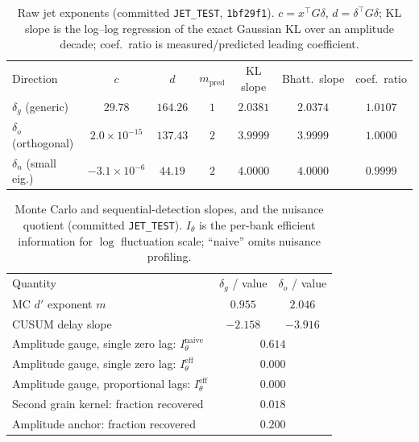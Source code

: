 \documentclass[aps,prl,onecolumn,notitlepage,nofootinbib,superscriptaddress]{revtex4-2}
\begin{document}
\begin{table}[h]
\centering
\caption{Raw jet exponents (committed \texttt{JET\_TEST}, \texttt{1bf29f1}).
$c=x^{\!\top}G\delta$, $d=\delta^{\!\top}G\delta$; KL slope is the log--log
regression of the exact Gaussian KL over an amplitude decade; coef.\ ratio is
measured/predicted leading coefficient.}
\label{tab:jet_exp}
\begin{ruledtabular}
\begin{tabular}{lcccccc}
Direction & $c$ & $d$ & $m_{\mathrm{pred}}$ & KL slope & Bhatt.\ slope & coef.\ ratio\\
\colrule
$\delta_g$ (generic)     & $29.78$              & $164.26$ & $1$ & $2.0381$ & $2.0374$ & $1.0107$\\
$\delta_o$ (orthogonal)  & $2.0\times10^{-15}$  & $137.43$ & $2$ & $3.9999$ & $3.9999$ & $1.0000$\\
$\delta_n$ (small eig.)  & $-3.1\times10^{-6}$  & $44.19$  & $2$ & $4.0000$ & $4.0000$ & $0.9999$\\
\end{tabular}
\end{ruledtabular}
\end{table}

\begin{table}[h]
\centering
\caption{Monte Carlo and sequential-detection slopes, and the nuisance quotient
(committed \texttt{JET\_TEST}). $I_\theta$ is the per-bank efficient information
for $\log$ fluctuation scale; ``naive'' omits nuisance profiling.}
\label{tab:jet_mc}
\begin{ruledtabular}
\begin{tabular}{lcc}
Quantity & $\delta_g$ / value & $\delta_o$ / value\\
\colrule
MC $d'$ exponent $m$                   & $0.955$  & $2.046$\\
CUSUM delay slope                       & $-2.158$ & $-3.916$\\
\colrule
Amplitude gauge, single zero lag: $I_\theta^{\mathrm{naive}}$ & \multicolumn{2}{c}{$0.614$}\\
Amplitude gauge, single zero lag: $I_\theta^{\mathrm{eff}}$   & \multicolumn{2}{c}{$0.000$}\\
Amplitude gauge, proportional lags: $I_\theta^{\mathrm{eff}}$ & \multicolumn{2}{c}{$0.000$}\\
Second grain kernel: fraction recovered                       & \multicolumn{2}{c}{$0.018$}\\
Amplitude anchor: fraction recovered                          & \multicolumn{2}{c}{$0.200$}\\
\end{tabular}
\end{ruledtabular}
\end{table}
\end{document}
